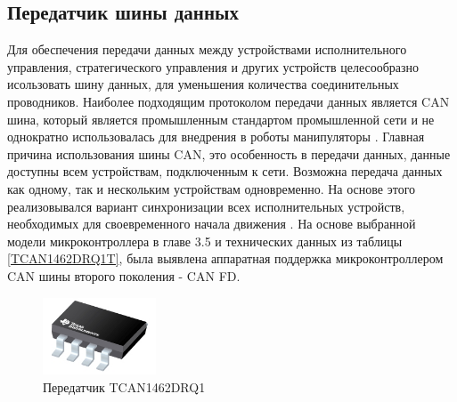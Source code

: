 \subsection{Передатчик шины данных}
Для обеспечения передачи данных между устройствами исполнительного управления, стратегического управления и других устройств целесообразно исользовать шину данных, для уменьшения количества соединительных проводников. Наиболее подходящим протоколом передачи данных является CAN шина, который является промышленным стандартом промышленной сети и не однократно использовалась для внедрения в роботы манипуляторы \citep{Megalingam2021}.
Главная причина использования шины CAN, это особенность в передачи данных, данные доступны всем устройствам, подключенным к сети. Возможна передача данных как одному, так и нескольким устройствам одновременно. На основе этого реализовывался вариант синхронизации всех исполнительных устройств, необходимых для своевременного начала движения \citep{stmfdcan}.
На основе выбранной модели микроконтроллера в главе 3.5 и технических данных из таблицы \ref{TCAN1462DRQ1T}, была выявлена аппаратная поддержка микроконтроллером CAN шины второго поколения - CAN FD.

\begin{figure}[H]
	\centering
	\includegraphics[width=0.3\textwidth]{Src/images/Trans.png}
	\caption{Передатчик TCAN1462DRQ1}
	\label{TCAN1462DRQ1}
\end{figure}






